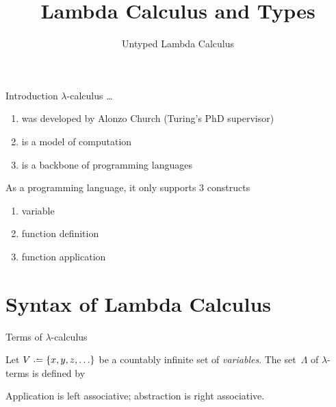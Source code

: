 \title{Lambda Calculus and Types}
\subtitle{Untyped Lambda Calculus}

\begin{frame}
\maketitle
\end{frame}

\begin{frame}{Introduction}
  $\lambda$-calculus \dots
  \begin{enumerate}
    \item was developed by Alonzo Church (Turing's PhD supervisor)
    \item is a model of computation
    \item is a backbone of programming languages
  \end{enumerate}
  As a programming language, it only supports $3$ constructs 
  \begin{enumerate}
    \item variable
    \item function definition
    \item function application
  \end{enumerate}
\end{frame}

\section{Syntax of Lambda Calculus}

\begin{frame}{Terms of $\lambda$-calculus}
\begin{definition}
  Let $V \defeq \{ x, y, z, \ldots \}$ be a countably infinite set of
  \emph{variables}. The set~$\Lambda$ of \alert{$\lambda$-terms} is defined
  by
    \begin{prooftree}
    \end{prooftree}
    \begin{prooftree}
    \end{prooftree}
    \begin{prooftree}
    \end{prooftree}
\noindent Application is left associative; abstraction is right associative. 
\end{definition}
\end{frame}

